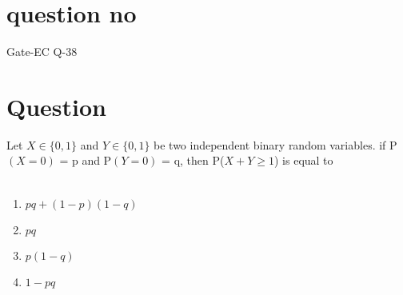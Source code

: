 \documentclass[journal,12pt,twocolumn]{IEEEtran}
\begin{document}
\section*{question no}
Gate-EC Q-38
\section*{Question}
Let  $X\in \{ 0,1 \}$ and $Y\in \{ 0,1 \}$ be two independent binary random variables. if P$(X=0)$ = p and  P$(Y=0)$ = q, then P($X+Y \geqslant 1$) is equal to\\\\
\begin{enumerate}
\item $pq+(1-p)(1-q)$ \\
\item  $pq$    \\
\item $p(1-q)$ \\
\item  $1-pq$  \\
\end{enumerate}
\end{document}
